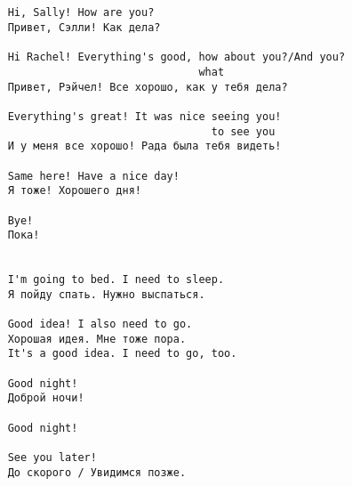 \subsection*{}
\begin{verbatim}
    Hi, Sally! How are you?
    Привет, Сэлли! Как дела?

    Hi Rachel! Everything's good, how about you?/And you?
                                  what
    Привет, Рэйчел! Все хорошо, как у тебя дела?

    Everything's great! It was nice seeing you!
                                    to see you
    И у меня все хорошо! Рада была тебя видеть!

    Same here! Have a nice day!
    Я тоже! Хорошего дня!

    Bye!
    Пока!


    I'm going to bed. I need to sleep.
    Я пойду спать. Нужно выспаться.

    Good idea! I also need to go.
    Хорошая идея. Мне тоже пора.
    It's a good idea. I need to go, too.

    Good night!
    Доброй ночи!

    Good night!

    See you later!
    До скорого / Увидимся позже.
\end{verbatim}
